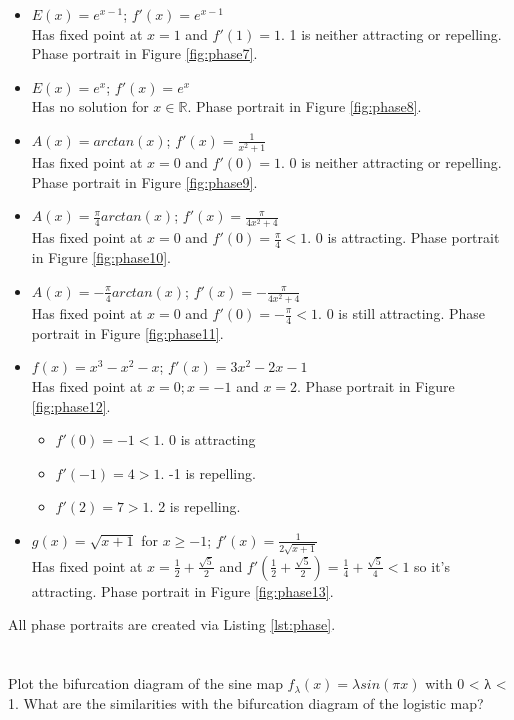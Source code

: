 \documentclass[11pt]{article}
\begin{document}
\begin{itemize}
    \item $E(x) = e^{x-1}$; $f'(x) = e^{x-1}$\\Has fixed point at $x = 1$ and $f'(1) = 1$. 1 is neither attracting or repelling. Phase portrait in Figure \ref{fig:phase7}.
    \item $E(x) = e^x$; $f'(x) = e^x$\\Has no solution for $x \in \mathbb{R}$. Phase portrait in Figure \ref{fig:phase8}.
    \item $A(x) = arctan(x)$; $f'(x) = \frac{1}{x^2 +1}$\\Has fixed point at $x = 0$ and $f'(0) = 1$. 0 is neither attracting or repelling. Phase portrait in Figure \ref{fig:phase9}.
    \item $A(x) = \frac{\pi}{4}arctan(x)$; $f'(x) = \frac{\pi}{4x^2 + 4}$\\Has fixed point at $x = 0$ and $f'(0) = \frac{\pi}{4} < 1$. 0 is attracting. Phase portrait in Figure \ref{fig:phase10}.
    \item $A(x) = -\frac{\pi}{4}arctan(x)$; $f'(x) = -\frac{\pi}{4x^2 + 4}$\\Has fixed point at $x = 0$ and $f'(0) = -\frac{\pi}{4} < 1$. 0 is still attracting. Phase portrait in Figure \ref{fig:phase11}.
    \item $f(x) = x^3 - x^2 -x$; $f'(x) = 3x^2 - 2x - 1$\\Has fixed point at $x = 0; x = -1$ and $x = 2 $. Phase portrait in Figure \ref{fig:phase12}.
        \begin{itemize}
            \item  $f'(0) = -1 < 1$. 0 is attracting
            \item  $f'(-1) = 4 > 1$. -1 is repelling.
            \item  $f'(2) = 7 > 1$. 2 is repelling.
        \end{itemize}
    \item $g(x) = \sqrt{x+1}$ for $x \geqslant -1$; $f'(x) = \frac{1}{2\sqrt{x+1}}$\\Has fixed point at $x = \frac{1}{2} + \frac{\sqrt{5}}{2}$ and $f'(\frac{1}{2} + \frac{\sqrt{5}}{2}) = \frac{1}{4} + \frac{\sqrt{5}}{4} < 1$ so it's attracting. Phase portrait in Figure \ref{fig:phase13}.
\end{itemize}


All phase portraits are created via Listing \ref{lst:phase}.


\hypertarget{6}{%
\section{}\label{6}} Plot the bifurcation diagram of the sine map $f_{λ} (x) = λ sin(πx)$ with 0 < λ < 1.
What are the similarities with the bifurcation diagram of the logistic map?
\end{document}
